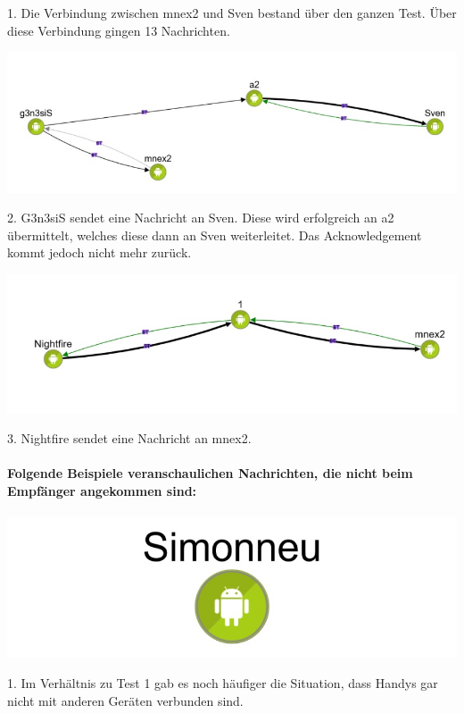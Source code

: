 1. Die Verbindung zwischen mnex2 und Sven bestand über den ganzen Test.
Über diese Verbindung gingen 13 Nachrichten.

\includegraphics[width=1.0\textwidth]{belege/grosstests/Bilder/Grosstest2/Test2Erfolg3.jpg}

2. G3n3siS sendet eine Nachricht an Sven. Diese wird erfolgreich an a2
übermittelt, welches diese dann an Sven weiterleitet. Das
Acknowledgement kommt jedoch nicht mehr zurück.

\includegraphics[width=1.0\textwidth]{belege/grosstests/Bilder/Grosstest2/Test2Erfolg4.jpg}

3. Nightfire sendet eine Nachricht an mnex2.

\paragraph{Folgende Beispiele veranschaulichen Nachrichten, die nicht beim Empfänger angekommen sind:}

\includegraphics[width=1.0\textwidth]{belege/grosstests/Bilder/Grosstest2/Test2Misserfolg1.jpg}

1. Im Verhältnis zu Test 1 gab es noch häufiger die Situation, dass Handys
gar nicht mit anderen Geräten verbunden sind.

